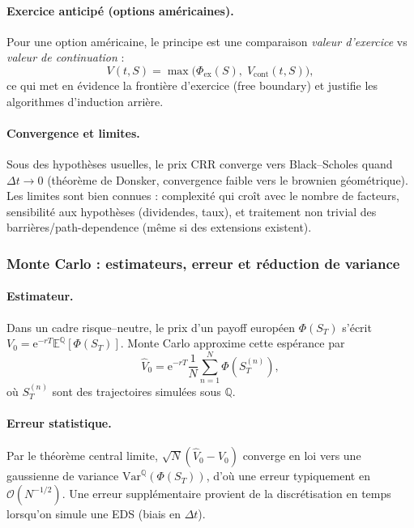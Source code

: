 \documentclass[11pt,a4paper]{article}
\newcommand{\ee}{\mathrm{e}}
\newcommand{\E}{\mathbb{E}}
\newcommand{\QQ}{\mathbb{Q}}
\newcommand{\1}{\mathbf{1}}
\begin{document}
\paragraph{Exercice anticip\'e (options am\'ericaines).}
Pour une option am\'ericaine, le principe est une comparaison \emph{valeur d'exercice} vs \emph{valeur de continuation} :
\[
V(t,S)=\max\bigl(\Phi_{\text{ex}}(S),\;V_{\text{cont}}(t,S)\bigr),
\]
ce qui met en \'evidence la fronti\`ere d'exercice (free boundary) et justifie les algorithmes d'induction arri\`ere.

\paragraph{Convergence et limites.}
Sous des hypoth\`eses usuelles, le prix CRR converge vers Black--Scholes quand $\Delta t\to 0$ (th\'eor\`eme de Donsker,
convergence faible vers le brownien g\'eom\'etrique). Les limites sont bien connues : complexit\'e qui cro\^it avec le nombre
de facteurs, sensibilit\'e aux hypoth\`eses (dividendes, taux), et traitement non trivial des barri\`eres/path-dependence
(m\^eme si des extensions existent).

\subsubsection{Monte Carlo : estimateurs, erreur et r\'eduction de variance}

\paragraph{Estimateur.}
Dans un cadre risque--neutre, le prix d'un payoff europ\'een $\Phi(S_T)$ s'\'ecrit
$V_0=\ee^{-rT}\E^{\QQ}[\Phi(S_T)]$. Monte Carlo approxime cette esp\'erance par
\[
\widehat V_0=\ee^{-rT}\frac{1}{N}\sum_{n=1}^N \Phi\!\left(S_T^{(n)}\right),
\]
o\`u $S_T^{(n)}$ sont des trajectoires simul\'ees sous $\QQ$.

\paragraph{Erreur statistique.}
Par le th\'eor\`eme central limite, $\sqrt{N}(\widehat V_0-V_0)$ converge en loi vers une gaussienne de variance
$\mathrm{Var}^{\QQ}(\Phi(S_T))$, d'o\`u une erreur typiquement en $\mathcal{O}(N^{-1/2})$. Une erreur suppl\'ementaire
provient de la discr\'etisation en temps lorsqu'on simule une EDS (biais en $\Delta t$).
\end{document}
